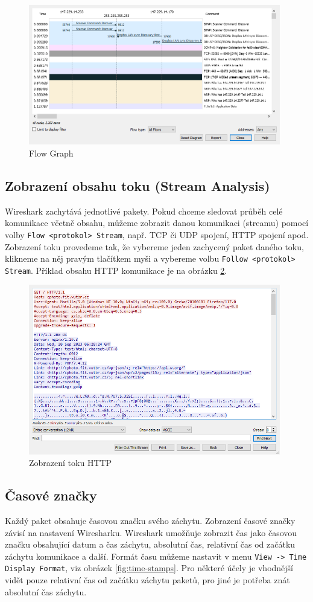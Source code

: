 \begin{figure}[h]
  \centering
  \includegraphics[width=110mm]{fig/flow-graph.png}
  \caption{Flow Graph}\label{fig:flow-graph}
\end{figure}

\subsection{Zobrazení obsahu toku (Stream Analysis)}
Wireshark zachytává jednotlivé pakety. Pokud chceme sledovat průběh celé komunikace včetně obsahu, můžeme  zobrazit danou komunikaci (streamu) pomocí volby \texttt{Flow <protokol> Stream}, např. TCP či UDP spojení, HTTP spojení apod. Zobrazení toku provedeme tak, že vybereme jeden zachycený paket daného toku, klikneme na něj pravým tlačítkem myši a vybereme volbu  \texttt{Follow <protokol> Stream}. Příklad obsahu HTTP komunikace je na obrázku \ref{fig:follow_stream}.

\begin{figure}[h]
  \centering
  \includegraphics[width=110mm]{fig/follow_stream.png}
  \caption{Zobrazení toku HTTP}\label{fig:follow_stream}
\end{figure}

\subsection{Časové značky}
Každý paket obsahuje časovou značku svého záchytu. Zobrazení časové značky závisí na nastavení Wiresharku. Wireshark umožňuje zobrazit čas jako časovou značku obsahující datum a čas záchytu, absolutní čas, relativní čas od začátku záchytu komunikace a další. Formát času můžeme nastavit v menu \texttt{View -> Time Display Format}, viz obrázek \ref{fig:time-stamps}. Pro některé účely je vhodnější vidět pouze relativní čas od začátku záchytu paketů, pro jiné je potřeba znát absolutní čas záchytu. 

